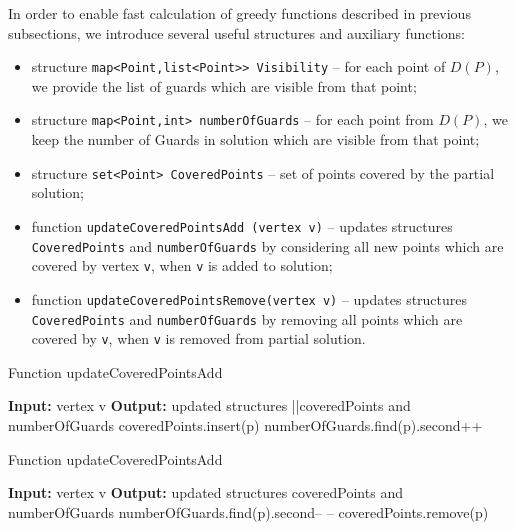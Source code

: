 \documentclass[runningheads,a4paper]{elsarticle}
\begin{document}
	In order to enable fast calculation of greedy functions described in previous subsections, we introduce several useful structures and auxiliary functions:
	\begin{itemize}
		\item structure \texttt{map<Point,list<Point>> Visibility} -- for each point of $D(P)$, we provide the list of guards which are visible from that point;
		\item structure \texttt{map<Point,int> numberOfGuards} -- for each point from $D(P)$,  we keep the number of Guards in solution which are visible from that point;
		\item structure \texttt{set<Point> CoveredPoints} -- set of points covered by the partial solution;
		\item function \texttt{updateCoveredPointsAdd (vertex v)} -- updates  structures \texttt{CoveredPoints} and \texttt{numberOfGuards} by considering all new points which are covered by vertex \texttt{v}, when \texttt{v} is added to solution;
		\item function \texttt{updateCoveredPointsRemove(vertex v)} -- updates  structures \texttt{CoveredPoints} and \texttt{numberOfGuards} by removing all points which are covered by \texttt{v}, when \texttt{v} is removed from partial solution.
	\end{itemize}
	\begin{algorithm}[!t]
          	\caption{Function updateCoveredPointsAdd}\label{alg:updateCoveredPointsAdd}
          	\begin{algorithmic}[1]
          		\State \textbf{Input:} vertex v
          		\State \textbf{Output:} updated structures ||coveredPoints and numberOfGuards
          		\State coveredPoints.insert(p)
          		\State numberOfGuards.find(p).second++
          		\EndFor
          	\end{algorithmic}
          \end{algorithm}
                    \begin{algorithm}[!t]
          	\caption{Function updateCoveredPointsAdd}\label{alg:updateCoveredPointsRemove}
          	\begin{algorithmic}[1]
          		\State \textbf{Input:} vertex v
          		\State \textbf{Output:} updated structures coveredPoints and numberOfGuards
          		\State numberOfGuards.find(p).second-- --
                    \State coveredPoints.remove(p)
                    \EndIf
          		\EndFor
          	\end{algorithmic}
          \end{algorithm}
	
\end{document}
